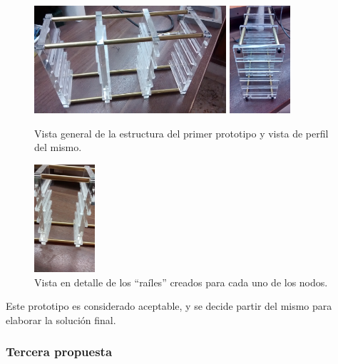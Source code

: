\begin{figure}[H]
\centering
\includegraphics[width=0.635\textwidth]{Chapter5/Figures/prototipo1vistageneral}
\includegraphics[width=0.2\textwidth]{Chapter5/Figures/prototipo1vistaperfil}
\caption[Vista general del primer prototipo]{Vista general de la estructura del primer prototipo y vista de perfil del mismo.}
\end{figure}

\begin{figure}[H]
\centering
\includegraphics[width=0.2\textwidth]{Chapter5/Figures/prototipo1vistadetalle}
\caption[Vista en detalle de los ``raíles'' del primer prototipo.]{Vista en detalle de los ``raíles'' creados para cada uno de los nodos.}
\end{figure}

Este prototipo es considerado aceptable, y se decide partir del mismo para elaborar la solución final.

\subsubsection{Tercera propuesta}

